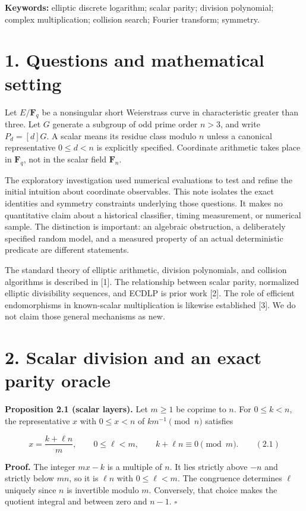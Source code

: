\documentclass[
  11pt,
  a4paper,
]{article}
\begin{document}
\textbf{Keywords:} elliptic discrete logarithm; scalar parity; division
polynomial; complex multiplication; collision search; Fourier transform;
symmetry.

\section{1. Questions and mathematical
setting}\label{questions-and-mathematical-setting}

Let \(E/\mathbf F_q\) be a nonsingular short Weierstrass curve in
characteristic greater than three. Let \(G\) generate a subgroup of odd
prime order \(n>3\), and write \(P_d=[d]G\). A scalar means its residue
class modulo \(n\) unless a canonical representative \(0\leq d<n\) is
explicitly specified. Coordinate arithmetic takes place in
\(\mathbf F_q\), not in the scalar field \(\mathbf F_n\).

The exploratory investigation used numerical evaluations to test and
refine the initial intuition about coordinate observables. This note
isolates the exact identities and symmetry constraints underlying those
questions. It makes no quantitative claim about a historical classifier,
timing measurement, or numerical sample. The distinction is important:
an algebraic obstruction, a deliberately specified random model, and a
measured property of an actual deterministic predicate are different
statements.

The standard theory of elliptic arithmetic, division polynomials, and
collision algorithms is described in {[}1{]}. The relationship between
scalar parity, normalized elliptic divisibility sequences, and ECDLP is
prior work {[}2{]}. The role of efficient endomorphisms in known-scalar
multiplication is likewise established {[}3{]}. We do not claim those
general mechanisms as new.

\section{2. Scalar division and an exact parity
oracle}\label{scalar-division-and-an-exact-parity-oracle}

\textbf{Proposition 2.1 (scalar layers).} Let \(m\geq1\) be coprime to
\(n\). For \(0\leq k<n\), the representative \(x\) with \(0\leq x<n\) of
\(km^{-1}\pmod n\) satisfies

\[
x=\frac{k+\ell n}{m},\qquad 0\leq\ell<m,\qquad
k+\ell n\equiv0\pmod m. \qquad (2.1)
\]

\textbf{Proof.} The integer \(mx-k\) is a multiple of \(n\). It lies
strictly above \(-n\) and strictly below \(mn\), so it is \(\ell n\)
with \(0\leq\ell<m\). The congruence determines \(\ell\) uniquely since
\(n\) is invertible modulo \(m\). Conversely, that choice makes the
quotient integral and between zero and \(n-1\). \(\square\)
\end{document}
